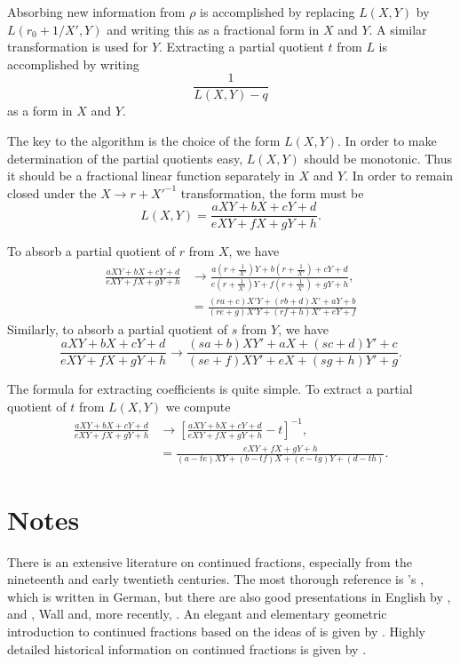 Absorbing new information from $\rho$ is accomplished by replacing
$L(X,Y)$ by $L(r_0 + 1/X',Y)$ and writing this as a fractional form in
$X$ and $Y$.  A similar transformation is used for $Y$.
Extracting a partial quotient $t$ from $L$ is accomplished by writing
\[
\frac{1}{L(X,Y)-q}
\]
as a form in $X$ and $Y$.

The key to the algorithm is the choice of the form $L(X,Y)$.  In order
to make determination of the partial quotients easy, $L(X,Y)$ should
be monotonic. Thus it should be a fractional linear function
separately in $X$ and $Y$.  In order to remain closed under the 
$X \rightarrow r + {X'}^{-1}$ transformation, the form must
be
\[
L(X, Y) = \frac{aXY + b X + c Y + d}{e XY + f X + g Y + h}.
\]

To absorb a partial quotient of $r$ from $X$, we have
\[
\begin{aligned}
 \frac{aXY + b X + c Y + d}{e XY + f X + g Y + h} &\longrightarrow
 \frac{a\left(r + \frac{1}{X'}\right)Y + b \left(r + \frac{1}{X'}\right) + c Y + d}{e \left(r + \frac{1}{X'}\right)Y + f \left(r + \frac{1}{X'}\right) + g Y + h},\\
&= \frac{(r a + c)X'Y + (rb + d) X' + a Y + b}{(r e + g)X'Y + (rf + h) X' + e Y + f}
\end{aligned}
\]
Similarly, to absorb a partial quotient of $s$ from $Y$, we have
\[
 \frac{aXY + b X + c Y + d}{e XY + f X + g Y + h} \longrightarrow
\frac{(s a + b)XY' + a X + (sc + d) Y' + c}{(s e + f)XY' + e X + (sg + h)
Y' + g}.
\]

The formula for extracting  coefficients is quite simple.  To extract
a partial quotient of $t$ from $L(X,Y)$ we compute
\[
\begin{aligned}
 \frac{aXY + b X + c Y + d}{e XY + f X + g Y + h} &\longrightarrow
 \left[ \frac{aXY + b X + c Y + d}{e XY + f X + g Y + h} -
t\right]^{-1}, \\
 & =  \frac{e XY + f X + g Y + h}{(a - t e)XY + (b- tf) X + (c - tg) Y
+ (d - th)}.
\end{aligned}
\]

\section*{Notes}


\small

There is an extensive literature on continued fractions, especially
from the nineteenth and early twentieth centuries.  The most thorough
reference is {\Perron}'s \cite{Perron:CF}, which is written in German,
but there are also good presentations in English by {\Chrystal}
\cite{Chrystal:Algebra}, {\Hardy} and {\Wright} \cite{Hardy:Wright},
Wall \cite{Wall:CF} and, more recently, {\Olds} \cite{Olds:CF}.  An
elegant and elementary geometric introduction to continued fractions
based on the ideas of {\Klein} \cite{Klein:1895} is given by {\Stark}
\cite{Stark:1970}.  Highly detailed historical information on
continued fractions is given by {\Brezinski} \cite{Brezinski:1991}.

